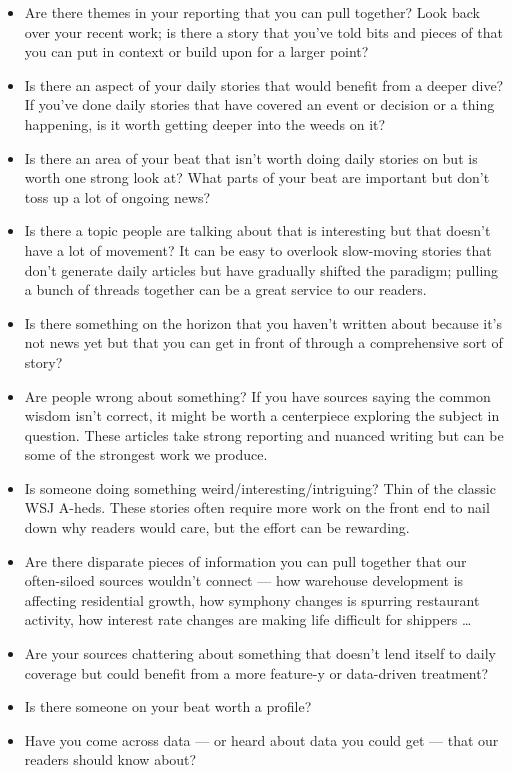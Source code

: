 \documentclass[
  12pt,
  american,
  letterpaperpaper,
  extrafontsizes,onecolumn,openright
  ]{memoir}
\providecommand{\tightlist}{%
  \setlength{\itemsep}{0pt}\setlength{\parskip}{0pt}}
\begin{document}
\begin{itemize}
\tightlist
\item
  Are there themes in your reporting that you can pull together? Look back over your recent work; is there a story that you've told bits and pieces of that you can put in context or build upon for a larger point?
\item
  Is there an aspect of your daily stories that would benefit from a deeper dive? If you've done daily stories that have covered an event or decision or a thing happening, is it worth getting deeper into the weeds on it?
\item
  Is there an area of your beat that isn't worth doing daily stories on but is worth one strong look at? What parts of your beat are important but don't toss up a lot of ongoing news?
\item
  Is there a topic people are talking about that is interesting but that doesn't have a lot of movement? It can be easy to overlook slow-moving stories that don't generate daily articles but have gradually shifted the paradigm; pulling a bunch of threads together can be a great service to our readers.
\item
  Is there something on the horizon that you haven't written about because it's not news yet but that you can get in front of through a comprehensive sort of story?
\item
  Are people wrong about something? If you have sources saying the common wisdom isn't correct, it might be worth a centerpiece exploring the subject in question. These articles take strong reporting and nuanced writing but can be some of the strongest work we produce.
\item
  Is someone doing something weird/interesting/intriguing? Thin of the classic WSJ A-heds. These stories often require more work on the front end to nail down why readers would care, but the effort can be rewarding.
\item
  Are there disparate pieces of information you can pull together that our often-siloed sources wouldn't connect --- how warehouse development is affecting residential growth, how symphony changes is spurring restaurant activity, how interest rate changes are making life difficult for shippers \ldots{}
\item
  Are your sources chattering about something that doesn't lend itself to daily coverage but could benefit from a more feature-y or data-driven treatment?
\item
  Is there someone on your beat worth a profile?
\item
  Have you come across data --- or heard about data you could get --- that our readers should know about?
\end{itemize}
\end{document}
